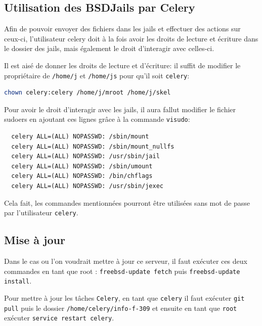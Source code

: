 \documentclass[10pt,a4paper]{article}
\begin{document}
\subsection{Utilisation des BSDJails par Celery}
Afin de pouvoir envoyer des fichiers dans les jails et effectuer des actions sur ceux-ci, l'utilisateur celery doit à la fois avoir les droits de lecture et écriture dans le dossier des jails, mais également le droit d'interagir avec celles-ci.

Il est aisé de donner les droits de lecture et d'écriture: il suffit de modifier le propriétaire de \texttt{/home/j} et \texttt{/home/js} pour qu'il soit \texttt{celery}:
\begin{lstlisting}[language=bash]
  chown celery:celery /home/j/mroot /home/j/skel
\end{lstlisting}

Pour avoir le droit d'interagir avec les jails, il aura fallut modifier le fichier sudoers
en ajoutant ces lignes grâce à la commande \texttt{visudo}:
\begin{lstlisting}
  celery ALL=(ALL) NOPASSWD: /sbin/mount
  celery ALL=(ALL) NOPASSWD: /sbin/mount_nullfs
  celery ALL=(ALL) NOPASSWD: /usr/sbin/jail
  celery ALL=(ALL) NOPASSWD: /sbin/umount
  celery ALL=(ALL) NOPASSWD: /bin/chflags
  celery ALL=(ALL) NOPASSWD: /usr/sbin/jexec
\end{lstlisting}
Cela fait, les commandes mentionnées pourront être utilisées sans mot de passe par l'utilisateur \texttt{celery}.


\subsection{Mise à jour}

Dans le cas ou l'on voudrait mettre à jour ce serveur,
il faut exécuter ces deux commandes en tant que root :
\texttt{freebsd-update fetch} puis \texttt{freebsd-update install}.

Pour mettre à jour les tâches \texttt{Celery},
en tant que \texttt{celery} il faut exécuter \texttt{git pull}
puis le dossier \texttt{/home/celery/info-f-309}
et ensuite en tant que \texttt{root} exécuter \texttt{service restart celery}.
\end{document}
